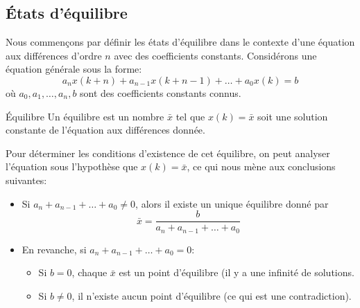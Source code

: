         \subsection{États d'équilibre}
            Nous commençons par définir les états d'équilibre dans le contexte d'une équation aux différences d'ordre $n$ avec des coefficients constants. Considérons une équation générale sous la forme:
            \begin{equation}
                a_n x(k+n)+a_{n-1} x(k+n-1)+\dots+a_0 x(k) = b
            \end{equation}
            où $a_0, a_1, \dots, a_n, b$ sont des coefficients constants connus.
            \begin{definition}{Équilibre}
                Un équilibre est un nombre $\bar{x}$ tel que $x(k) = \bar{x}$ soit une solution constante de l'équation aux différences donnée.
            \end{definition}
            Pour déterminer les conditions d'existence de cet équilibre, on peut analyser l'équation sous l'hypothèse que $x(k) = \bar{x}$, ce qui nous mène aux conclusions suivantes:
            \begin{itemize}
                \item Si $a_n+a_{n-1}+\dots+a_0 \neq 0$, alors il existe un unique équilibre donné par
                \begin{equation}
                    \bar{x} = \frac{b}{a_n+a_{n-1}+\dots+a_0}
                \end{equation}
                \item En revanche, si $a_n+a_{n-1}+\dots+a_0 = 0$:
                \begin{itemize}
                    \item Si $b = 0$, chaque $\bar{x}$ est un point d'équilibre (il y a une infinité de solutions.
                    \item Si $b \neq 0$, il n'existe aucun point d'équilibre (ce qui est une contradiction).
                \end{itemize}
            \end{itemize}

